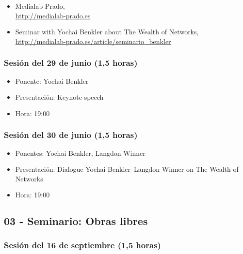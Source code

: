 \documentclass[a4paper,12pt]{article}
\begin{document}
\begin{itemize}
\item Medialab Prado, \\
  \url{http://medialab-prado.es}
\item Seminar with Yochai Benkler about The Wealth of Networks, \\
  \url{http://medialab-prado.es/article/seminario_benkler}
\end{itemize}

\subsubsection{Sesión del 29 de junio (1,5 horas)}

\begin{itemize}
\item Ponente: Yochai Benkler
\item Presentación: Keynote speech
\item Hora: 19:00
\end{itemize}

\subsubsection{Sesión del 30 de junio (1,5 horas)}

\begin{itemize}
\item Ponentes: Yochai Benkler, Langdon Winner
\item Presentación: Dialogue Yochai Benkler--Langdon Winner on The Wealth of Networks
\item Hora: 19:00
\end{itemize}

\subsection{03 - Seminario: Obras libres}

\subsubsection{Sesión del 16 de septiembre (1,5 horas)}
\end{document}
